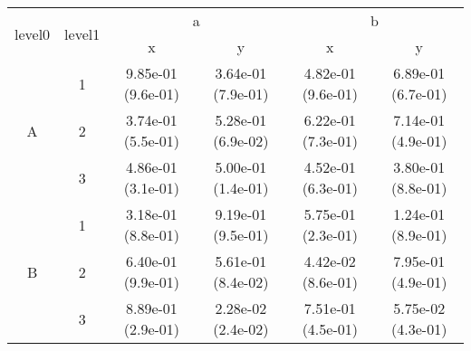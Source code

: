 \begin{tabular}{cccccc}
\toprule
\multirow{2}{*}{level0} & \multirow{2}{*}{level1}&\multicolumn{2}{c}{a}&\multicolumn{2}{c}{b}\tabularnewline
\cmidrule(lr){3-4}
\cmidrule(lr){5-6}
&&x&y&x&y\tabularnewline
\midrule
\multirow{3}{*}{A}&1& 9.85e-01 (9.6e-01)& 3.64e-01 (7.9e-01)& 4.82e-01 (9.6e-01)& 6.89e-01 (6.7e-01)\tabularnewline
&2& 3.74e-01 (5.5e-01)& 5.28e-01 (6.9e-02)& 6.22e-01 (7.3e-01)& 7.14e-01 (4.9e-01)\tabularnewline
&3& 4.86e-01 (3.1e-01)& 5.00e-01 (1.4e-01)& 4.52e-01 (6.3e-01)& 3.80e-01 (8.8e-01)\tabularnewline
\midrule
\multirow{3}{*}{B}&1& 3.18e-01 (8.8e-01)& 9.19e-01 (9.5e-01)& 5.75e-01 (2.3e-01)& 1.24e-01 (8.9e-01)\tabularnewline
&2& 6.40e-01 (9.9e-01)& 5.61e-01 (8.4e-02)& 4.42e-02 (8.6e-01)& 7.95e-01 (4.9e-01)\tabularnewline
&3& 8.89e-01 (2.9e-01)& 2.28e-02 (2.4e-02)& 7.51e-01 (4.5e-01)& 5.75e-02 (4.3e-01)\tabularnewline
\bottomrule
\end{tabular}
